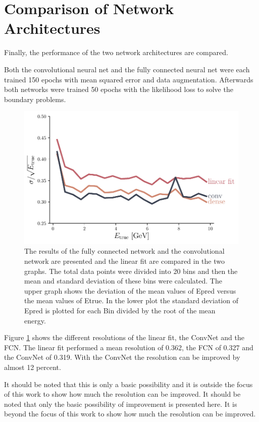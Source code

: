 \documentclass[12pt, a4paper]{thesis}
\begin{document}
\section{Comparison of Network Architectures}
\label{sec:org1df3a0b}

Finally, the performance of the two network architectures are
compared.

Both the convolutional neural net and the fully connected neural net
were each trained 150 epochs with mean squared error and data
augmentation. Afterwards both networks were trained 50 epochs with the
likelihood loss to solve the boundary problems.

\begin{figure}[H]
  \centering
  \includegraphics[width=.9\linewidth]{../images/arch_comparison.pdf}
  \caption{ The results of the fully connected network and the
    convolutional network are presented and the linear fit are
    compared in the two graphs. The total data points were divided
    into 20 bins and then the mean and standard deviation of these
    bins were calculated. The upper graph shows the deviation of the
    mean values of Epred versus the mean values of Etrue. In the lower
    plot the standard deviation of Epred is plotted for each Bin
    divided by the root of the mean energy.}
  \label{arch_comparison}
\end{figure}

Figure \ref{arch_comparison} shows the different resolutions of the
linear fit, the ConvNet and the FCN. The linear fit performed a mean
resolution of 0.362, the FCN of 0.327 and the ConvNet of 0.319. With
the ConvNet the resolution can be improved by almost 12 percent.

It should be noted that this is only a basic possibility and it is
outside the focus of this work to show how much the resolution can be
improved.  It should be noted that only the basic possibility of
improvement is presented here. It is beyond the focus of this work to
show how much the resolution can be improved.
\end{document}
